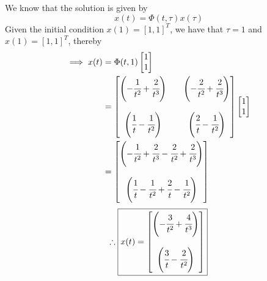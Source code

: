 We know that the solution is given by
\begin{equation*}
    x(t)
    =
    \Phi(t,\tau)x(\tau)
\end{equation*}
Given the initial condition \( x(1) = {[1, 1]}^T \), we have that \( \tau = 1 \) and \( x(1) = {[1, 1]}^T \), thereby
\begin{align*}
    \implies
    x(t)
     & =
    \Phi(t,1)
    \begin{bmatrix}
        1 \\
        1
    \end{bmatrix}
    \\ & =
    \begin{bmatrix}
        \left( -\cfrac{1}{t^2} + \cfrac{2}{t^3} \right)
         &  &
        \left( -\cfrac{2}{t^2} + \cfrac{2}{t^3} \right)
        \\ \\
        \left( \cfrac{1}{t} - \cfrac{1}{t^2} \right)
         &  &
        \left( \cfrac{2}{t} - \cfrac{1}{t^2} \right)
    \end{bmatrix}
    \begin{bmatrix}
        1 \\
        1
    \end{bmatrix}
    \\ & =
    \begin{bmatrix}
        \left( -\cfrac{1}{t^2} + \cfrac{2}{t^3} -\cfrac{2}{t^2} + \cfrac{2}{t^3} \right)
        \\ \\
        \left( \cfrac{1}{t} - \cfrac{1}{t^2} + \cfrac{2}{t} - \cfrac{1}{t^2} \right)
    \end{bmatrix}
\end{align*}
\begin{equation*}
    \therefore
    \boxed{
        x(t)
        =
        \begin{bmatrix}
            \left( -\cfrac{3}{t^2} + \cfrac{4}{t^3} \right)
            \\ \\
            \left( \cfrac{3}{t} - \cfrac{2}{t^2} \right)
        \end{bmatrix}
    }
\end{equation*}
